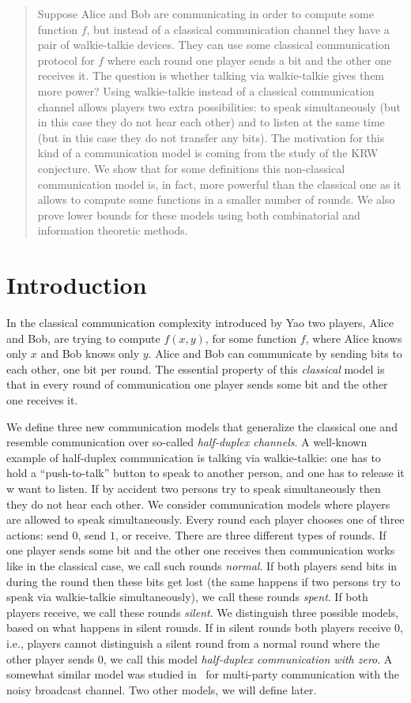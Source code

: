 \begin{abstract}
Suppose Alice and Bob are communicating in order to compute some function $f$, but instead of a classical communication channel they have a pair of walkie-talkie devices. They can use some classical communication protocol for $f$ where each round one player sends a bit and the other one receives it. The question is whether talking via walkie-talkie gives them more power? Using walkie-talkie instead of a classical communication channel allows players two extra possibilities: to speak simultaneously (but in this case they do not hear each other) and to listen at the same time (but in this case they do not transfer any bits). The motivation for this kind of a communication model is coming from the study of the KRW conjecture. We show that for some definitions this non-classical communication model is, in fact, more powerful than the classical one as it allows to compute some functions in a smaller number of rounds. We also prove lower bounds for these models using both combinatorial and information theoretic methods.
\end{abstract}


\section{Introduction}
In the classical communication complexity introduced by Yao \cite{Yao79}  two players, Alice and Bob,  are trying to compute $f(x,y)$, for some function $f$, where Alice knows only $x$ and Bob knows only $y$. Alice and Bob can communicate by sending bits to each other, one bit
per round. The essential property of this \emph{classical} model is that in every round of communication one player
sends some bit and the other one receives it.

We define three new communication models that generalize the classical one and resemble
communication over so-called \emph{half-duplex channels}.  A well-known example of half-duplex
communication is talking via walkie-talkie: one has to hold a ``push-to-talk'' button to speak to another person, and one has to release it w want to listen. 
If by accident two persons try to speak simultaneously then they do not hear each other. 
We consider communication models where players are allowed to speak simultaneously. 
Every round each player chooses one of three
actions: send $0$, send $1$, or receive. There are three different types of rounds.
If one player sends some bit and the other one receives then
communication works like in the classical case, we call such rounds \emph{normal}. 
If both players send bits in during the round then these bits get lost (the same happens if two persons try
to speak via walkie-talkie simultaneously), we call these rounds \emph{spent}. 
If both players receive, we call these rounds \emph{silent}. We distinguish three
possible models, based on what happens in silent rounds. If in silent rounds
both players receive $0$, i.e., players cannot distinguish a silent round from a normal round
where the other player sends $0$, we call this model \emph{half-duplex communication with zero}. A somewhat similar model was studied in~\cite{EKS17} for multi-party communication with the noisy broadcast channel. Two other models, we will define later.

